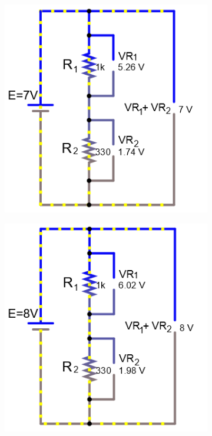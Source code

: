 \documentclass[a4paper]{article}
\begin{document}
\begin{figure}
\begin{subfigure}{0.48\textwidth}
\end{subfigure}
\begin{subfigure}{0.48\textwidth}
\includegraphics[width=1.03\linewidth]{volts_7}
\end{subfigure}
\begin{subfigure}{0.48\textwidth}
\includegraphics[width=1.03\linewidth]{volts_8}

\end{subfigure}
\end{figure}
\end{document}
